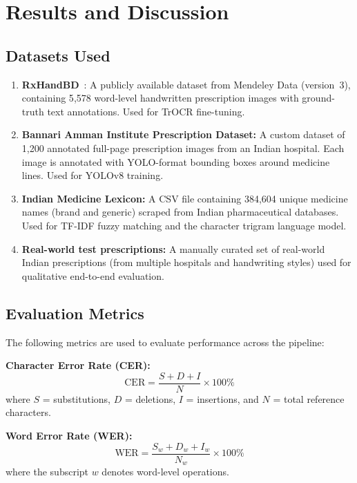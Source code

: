 \documentclass[12pt,a4paper,oneside]{report}
\begin{document}
\chapter{Results and Discussion}

\section{Datasets Used}

\begin{enumerate}
  \item \textbf{RxHandBD}~\cite{parvez2023rxhandbd}: A publicly available dataset from Mendeley Data (version~3), containing 5{,}578 word-level handwritten prescription images with ground-truth text annotations. Used for TrOCR fine-tuning.

  \item \textbf{Bannari Amman Institute Prescription Dataset:} A custom dataset of 1{,}200 annotated full-page prescription images from an Indian hospital. Each image is annotated with YOLO-format bounding boxes around medicine lines. Used for YOLOv8 training.

  \item \textbf{Indian Medicine Lexicon:} A CSV file containing 384{,}604 unique medicine names (brand and generic) scraped from Indian pharmaceutical databases. Used for TF-IDF fuzzy matching and the character trigram language model.

  \item \textbf{Real-world test prescriptions:} A manually curated set of real-world Indian prescriptions (from multiple hospitals and handwriting styles) used for qualitative end-to-end evaluation.
\end{enumerate}

\section{Evaluation Metrics}

The following metrics are used to evaluate performance across the pipeline:

\textbf{Character Error Rate (CER):}
\begin{equation}
\text{CER} = \frac{S + D + I}{N} \times 100\%
\end{equation}
where $S$ = substitutions, $D$ = deletions, $I$ = insertions, and $N$ = total reference characters.

\textbf{Word Error Rate (WER):}
\begin{equation}
\text{WER} = \frac{S_w + D_w + I_w}{N_w} \times 100\%
\end{equation}
where the subscript $w$ denotes word-level operations.
\end{document}
